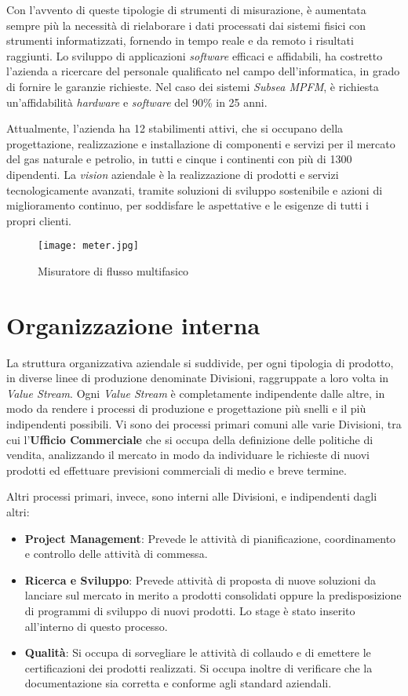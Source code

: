 Con l'avvento di queste tipologie di strumenti di misurazione, è aumentata sempre più la necessità di rielaborare i dati processati dai sistemi fisici con strumenti informatizzati, fornendo in tempo reale e da remoto i risultati raggiunti. Lo sviluppo di applicazioni \textit{software} efficaci e affidabili, ha costretto l'azienda a ricercare del personale qualificato nel campo dell'informatica, in grado di fornire le garanzie richieste. Nel caso dei sistemi \textit{Subsea MPFM}, è richiesta un'affidabilità \textit{hardware} e \textit{software} del 90\% in 25 anni. 

Attualmente, l'azienda ha 12 stabilimenti attivi, che si occupano della progettazione, realizzazione e installazione di componenti e servizi per il mercato del gas naturale e petrolio, in tutti e cinque i continenti con più di 1300 dipendenti. La \textit{vision} aziendale è la realizzazione di prodotti e servizi tecnologicamente avanzati, tramite soluzioni di sviluppo sostenibile e azioni di miglioramento continuo, per soddisfare le aspettative e le esigenze di tutti i propri clienti.

\begin{figure}[H]
  \centering
  \texttt{[image: meter.jpg]}
 
  \caption{Misuratore di flusso multifasico}
\end{figure}



\section{Organizzazione interna}
La struttura organizzativa aziendale si suddivide, per ogni tipologia di prodotto, in diverse linee di produzione denominate Divisioni, raggruppate a loro volta in \textit{Value Stream}. Ogni \textit{Value Stream} è completamente indipendente dalle altre, in modo da rendere i processi di produzione e progettazione più snelli e il più indipendenti possibili.
Vi sono dei processi primari comuni alle varie Divisioni, tra cui l'\textbf{Ufficio Commerciale} che si occupa della definizione delle politiche di vendita, analizzando il mercato in modo da individuare le richieste di nuovi prodotti ed effettuare previsioni commerciali di medio e breve termine.

Altri processi primari, invece, sono interni alle Divisioni, e indipendenti dagli altri:
\begin{itemize}
\item \textbf{Project Management}: Prevede le attività di pianificazione, coordinamento e controllo delle attività di commessa.
\item \textbf{Ricerca e Sviluppo}: Prevede attività di proposta di nuove soluzioni da lanciare sul mercato in merito a prodotti consolidati oppure la predisposizione di programmi di sviluppo di nuovi prodotti. Lo stage è stato inserito all'interno di questo processo.
\item \textbf{Qualità}: Si occupa di sorvegliare le attività di collaudo e di emettere le certificazioni dei prodotti realizzati. Si occupa inoltre di verificare che la documentazione sia corretta e conforme agli standard aziendali.
\end{itemize}

